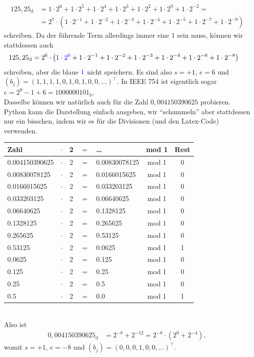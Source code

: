 \documentclass[english, parskip=full]{scrartcl}
\newcommand{\kla}{}
\newcommand{\tecxt}{}
\begin{document}
\begin{align}
125,25_\tecxt\text{d} &= 1\cdot 2^6 + 1\cdot 2^5 + 1\cdot 2^4 + 1\cdot 2^3 + 1\cdot 2^2 + 1\cdot 2^0 + 1\cdot 2^{-2} = \\
&= 2^7\cdot\kla\left( 1\cdot 2^{-1} + 1\cdot 2^{-2} + 1\cdot 2^{-3} + 1\cdot 2^{-4} + 1\cdot 2^{-5} + 1\cdot 2^{-7} + 1\cdot 2^{-9}  \right)
\end{align}
schreiben.
Da der führende Term allerdings immer eine 1 sein muss, können wir stattdessen auch
\begin{align}
125,25_\tecxt\text{d} &= 2^6\cdot\kla\left( {\color{blue}{1\cdot 2^{0}}} + 1\cdot 2^{-1} + 1\cdot 2^{-2} + 1\cdot 2^{-3} + 1\cdot 2^{-4} + 1\cdot 2^{-6} + 1\cdot 2^{-8}  \right)
\end{align}
schreiben, aber die blaue $\color{blue}{1}$ nicht speichern.
Es sind also $s=+1$, $e=6$ und $(b_j) = (1,1,1,1,0,1,0,1,0,0,\dots )^\top$.
In IEEE 754 ist eigentlich sogar $e=2^{9} - 1 + 6 = 1000000101_\tecxt\text{b}$.
\\
Dasselbe können wir natürlich auch für die Zahl $0,004150390625$ probieren.
Python kann die Darstellung einfach ausgeben, wir ``schummeln'' aber stattdessen nur ein bisschen, indem wir es für die Divisionen (und den Latex-Code) verwenden.
\begin{table}[!ht]
\centering
\begin{tabular}{lccclc|c}
Zahl & $\cdot$ & 2 & $=$ & \dots & mod 1  & Rest\\ \hline
0.004150390625 & $\cdot$ & 2 & $=$ & 0.00830078125 & mod 1 & 0\\
0.00830078125 & $\cdot$ & 2 & $=$ & 0.0166015625 & mod 1 & 0\\
0.0166015625 & $\cdot$ & 2 & $=$ & 0.033203125 & mod 1 & 0\\
0.033203125 & $\cdot$ & 2 & $=$ & 0.06640625 & mod 1 & 0\\
0.06640625 & $\cdot$ & 2 & $=$ & 0.1328125 & mod 1 & 0\\
0.1328125 & $\cdot$ & 2 & $=$ & 0.265625 & mod 1 & 0\\
0.265625 & $\cdot$ & 2 & $=$ & 0.53125 & mod 1 & 0\\
0.53125 & $\cdot$ & 2 & $=$ & 0.0625 & mod 1 & 1\\
0.0625 & $\cdot$ & 2 & $=$ & 0.125 & mod 1 & 0\\
0.125 & $\cdot$ & 2 & $=$ & 0.25 & mod 1 & 0\\
0.25 & $\cdot$ & 2 & $=$ & 0.5 & mod 1 & 0\\
0.5 & $\cdot$ & 2 & $=$ & 0.0 & mod 1 & 1\\
\end{tabular}
\end{table}
\\
Also ist
\begin{align}
0,004150390625_\tecxt\text{d} &= 2^{-8} + 2^{-12} = 2^{-8}\cdot \kla\left( 2^{0} + 2^{-4} \right),
\end{align}
womit $s=+1$, $e=-8$ und $(b_j) = (0,0,0,1,0,0,\dots)^\top$.
\end{document}

